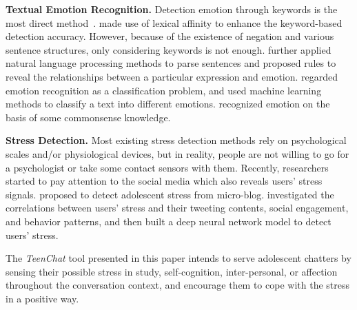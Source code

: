 \textbf{Textual Emotion Recognition.}
Detection emotion through keywords is the most direct method~\cite{39subasic2001,40olveres1998}.
\cite{42valitutti2004} made use of lexical affinity to enhance the keyword-based detection accuracy.
However, because of the existence of negation and various sentence structures,
only considering keywords is not enough. \cite{43neviarouskaya2007,44wu2006} further
applied natural language processing methods to parse sentences and
proposed rules to reveal the relationships between a particular expression and emotion.
\cite{45yang2007,46teng2006} regarded emotion recognition as a classification problem,
and used machine learning methods to classify a text into different emotions.
\cite{47balahur2011,49balahur2012affect} recognized emotion on the basis of some commonsense knowledge.

\textbf{Stress Detection.} Most existing stress detection methods rely on psychological scales and/or physiological devices,
but in reality, people are not willing to go for a psychologist or take some contact sensors with them.
Recently, researchers started to pay attention to the social media which also reveals users' stress signals.
\cite{34xue2014} proposed to detect adolescent stress from micro-blog.
\cite{33lin2014} investigated the correlations between users' stress and their tweeting contents,
social engagement, and behavior patterns, and then built a deep neural network model
to detect users' stress.

The \emph{TeenChat} tool presented in this paper intends to serve adolescent chatters by
sensing their possible stress in study, self-cognition, inter-personal, or affection throughout the conversation context,
and encourage them to cope with the stress in a positive way.


